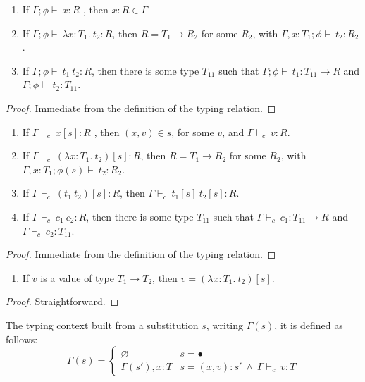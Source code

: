 \documentclass[preprint,authoryear,sort&compress,9pt,nocopyrightspace]{article}
\newcommand{\conf}[2][s]{(#2)[#1]}
\newcommand{\tyC}{{\Gamma \vdash_c \ }}
\newcommand{\env}{{\Gamma ; \emt   \vdash \ }}
\newcommand{\envE}{{\Gamma , x:T_1  ; \emt \vdash \ }}
\newcommand{\envEC}{{\Gamma , x:T_1 ; \emt(s) \vdash \ }}
\newcommand{\absD}{\lambda x:T_1. \ t_2}
\newcommand{\emt}{\phi}
\begin{document}
\begin{lemma}
\label{lemma:itt}
\mbox{}
\begin{enumerate}
\item If $\env x : R$ , then $x : R \in \Gamma$
\item If $\env \absD : R$, then $R = T_1 \to R_2$ for some $R_2$, with $\envE t_2 : R_2$.
\item If $\env t_1 \ t_2 : R$, then there is some type $T_{11}$ such that $\env t_1 : T_{11} \to R$ and $\env t_2 : T_{11}$.
\end{enumerate}
\end{lemma}
\begin{proof}
Immediate from the definition of the typing relation.
\end{proof}

\begin{lemma} 
\label{lemma:ict}
\mbox{}
\begin{enumerate}
\item If $\tyC x[s] : R$ , then $(x,v) \in s$, for some $v$, and $\tyC v:R$.
\item If $\tyC \conf{\absD}: R$, then $R = T_1 \to R_2$ for some $R_2$, with $\envEC t_2 : R_2$.
\item If $\tyC  \conf{t_1 \ t_2} : R$, then $\tyC  t_1 [s] \ t_2 [s]:R$.
\item If $\tyC   c_1 \ c_2 : R$, then there is some type $T_{11}$ such that $\tyC c_1 : T_{11} \to R$ and $\tyC c_2: T_{11}$.
\end{enumerate}
\end{lemma}

\begin{proof}Immediate from the definition of the typing relation.
\end{proof}

\begin{lemma} 
\label{lemma:cf}
\mbox{}
\begin{enumerate}
\item If $v$ is a value of type $T_1 \to T_2$, then $v = \conf{\absD}$.
\end{enumerate}
\end{lemma}

\begin{proof} Straightforward.
\end{proof}

\begin{definition}[$\Gamma(s)$]
\label{definition:tcs}
\mbox{}
The typing context built from a substitution $s$, writing $\Gamma(s)$, it is defined as follows:
\[ \Gamma(s) = \begin{cases} 
     \varnothing & s =  \bullet \\
      \Gamma(s'), x:T & s = (x,v):s' \ \land \ \tyC v : T 
   \end{cases}
\]
\end{definition}
\end{document}
